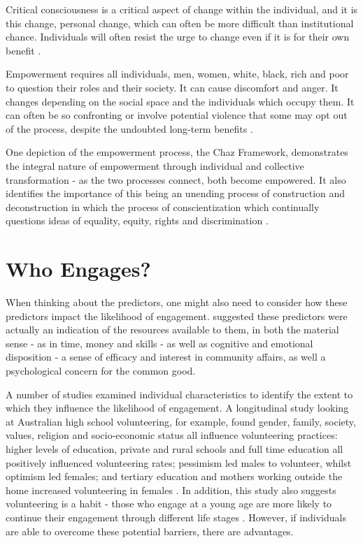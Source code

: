 Critical consciousness is a critical aspect of change within the individual, and it is this change, personal change, which can often be more difficult than institutional chance. Individuals will often resist the urge to change even if it is for their own benefit \citep{VeneKlasen2002}.

Empowerment requires all individuals, men, women, white, black, rich and poor to question their roles and their society. It can cause discomfort and anger. It changes depending on the social space and the individuals which occupy them. It can often be so confronting or involve potential violence that some may opt out of the process, despite the undoubted long-term benefits \citep{VeneKlasen2002}.

One depiction of the empowerment process, the Chaz Framework, demonstrates the integral nature of empowerment through individual and collective transformation - as the two processes connect, both become empowered. It also identifies the importance of this being an unending process of construction and deconstruction in which the process of conscientization which continually questions ideas of equality, equity, rights and discrimination \citep{VeneKlasen2002}.



\section{Who Engages?} 
When thinking about the predictors, one might also need to consider how these predictors impact the likelihood of engagement. \citet{Metz2003} suggested these predictors were actually an indication of the resources available to them, in both the material sense - as in time, money and skills - as well as cognitive and emotional disposition - a sense of efficacy and interest in community affairs, as well a psychological concern for the common good.

A number of studies examined individual characteristics to identify the extent to which they influence the likelihood of engagement. A longitudinal study looking at Australian high school volunteering, for example, found gender, family, society, values, religion and socio-economic status all influence volunteering practices: higher levels of education, private and rural schools and full time education all positively influenced volunteering rates; pessimism led males to volunteer, whilst optimism led females; and tertiary education and mothers working outside the home increased volunteering in females \citep{Brown2003}. In addition, this study also suggests volunteering is a habit - those who engage at a young age are more likely to continue their engagement through different life stages \citep{Brown2003}. However, if individuals are able to overcome these potential barriers, there are advantages. 


